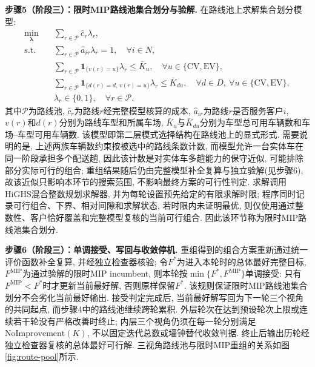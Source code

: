 \documentclass{setp-new}
\begin{document}
\textbf{步骤5（阶段三）：限时MIP路线池集合划分与验解.}
在路线池上求解集合划分模型:
\begin{equation}
\begin{aligned}
\min_{\boldsymbol\lambda}\quad
& \sum_{r\in\mathcal P}\hat c_r\lambda_r,\\
\mathrm{s.t.}\quad
& \sum_{r\in\mathcal P}\hat a_{ir}\lambda_r=1,
  \quad \forall i\in N,\\
& \sum_{r\in\mathcal P}\mathbf 1_{\{v(r)=u\}}\lambda_r\le \bar K_u,
  \quad \forall u\in\{\mathrm{CV},\mathrm{EV}\},\\
& \sum_{r\in\mathcal P}
  \mathbf 1_{\{d(r)=d,\,v(r)=u\}}\lambda_r\le \bar K_{du},
  \quad \forall d\in D,\ \forall u\in\{\mathrm{CV},\mathrm{EV}\},\\
& \lambda_r\in\{0,1\},
  \quad \forall r\in\mathcal P.
\end{aligned}
\label{eq:sp-recombination}
\end{equation}
其中$\mathcal P$为路线池, $\hat c_r$为路线$r$经完整模型核算的成本,
$\hat a_{ir}$为路线$r$是否服务客户$i$, $v(r)$和$d(r)$分别为路线车型和所属车场,
$\bar K_u$与$\bar K_{du}$分别为车型总可用车辆数和车场--车型可用车辆数.
该模型即第二层模式选择结构在路线池上的显式形式.
需要说明的是, 上述两族车辆数约束按被选中的路线条数计数,
而模型允许一台实体车在同一阶段承担多个配送趟,
因此该计数是对实体车多趟能力的保守近似, 可能排除部分实际可行的组合;
重组结果随后仍由完整模型补全复算与独立验解(见步骤6),
故该近似只影响本环节的搜索范围, 不影响最终方案的可行性判定.
求解调用HiGHS混合整数规划求解器\cite{ref:81}, 并为每轮设置预先给定的有限求解时限;
程序同时记录可行组合、下界、相对间隙和求解状态,
若时限内未证明最优, 则仅使用通过整数性、客户恰好覆盖和完整模型复核的当前可行组合.
因此该环节称为限时MIP路线池集合划分.

\textbf{步骤6（阶段三）：单调接受、写回与收敛停机.}
重组得到的组合方案重新通过统一评价函数补全复算, 并经独立检查器核验;
令$F^*$为进入本轮时的总体最好完整目标, $F^{\mathrm{MIP}}$为通过验解的限时MIP incumbent,
则本轮按$\min\{F^*,F^{\mathrm{MIP}}\}$单调接受:
只有$F^{\mathrm{MIP}}<F^*$时才更新当前最好解, 否则原样保留$F^*$.
该规则保证限时MIP路线池集合划分不会劣化当前最好输出.
接受判定完成后, 当前最好解写回为下一轮三个视角的共同起点,
而步骤4中的路线池继续跨轮累积.
外层轮次在达到预设轮次上限或连续若干轮没有严格改善时终止;
内层三个视角仍须在每一轮分别满足$\mathrm{NoImprovement}(K)$, 不以固定迭代总数或墙钟替代收敛判据.
终止后输出历轮经独立检查器复核的总体最好可行解.
三视角路线池与限时MIP重组的关系如图\ref{fig:route-pool}所示.
\end{document}
